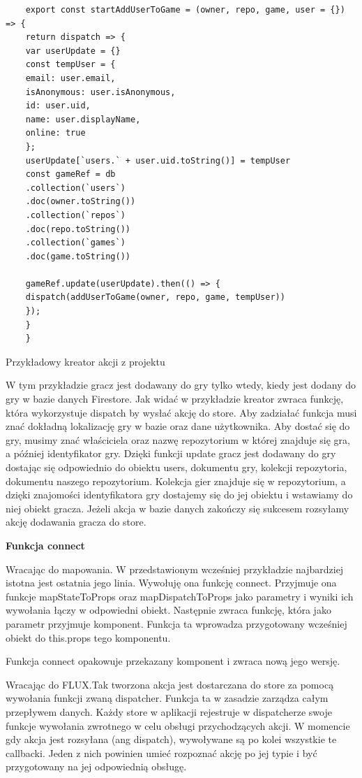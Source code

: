 \begin{listing}
	\begin{verbatim}
	export const startAddUserToGame = (owner, repo, game, user = {}) => {
	return dispatch => {
	var userUpdate = {}
	const tempUser = {
	email: user.email,
	isAnonymous: user.isAnonymous,
	id: user.uid,
	name: user.displayName,
	online: true
	};
	userUpdate[`users.` + user.uid.toString()] = tempUser
	const gameRef = db
	.collection(`users`)
	.doc(owner.toString())
	.collection(`repos`)
	.doc(repo.toString())
	.collection(`games`)
	.doc(game.toString())
	
	gameRef.update(userUpdate).then(() => {
	dispatch(addUserToGame(owner, repo, game, tempUser))
	});
	}
	}
	\end{verbatim}
	\caption{Przykładowy kreator akcji z projektu} \label{listing:firebase_action}
\end{listing}

W tym przykładzie gracz jest dodawany do gry tylko wtedy,
kiedy jest dodany do gry w bazie danych Firestore.
Jak widać w przykładzie kreator zwraca funkcję,
która wykorzystuje dispatch by wysłać akcję do store.
Aby zadziałać funkcja musi znać dokładną lokalizację gry w bazie oraz dane użytkownika.
Aby dostać się do gry, musimy znać właściciela oraz nazwę repozytorium w której znajduje się gra,
a później identyfikator gry.
Dzięki funkcji update gracz jest dodawany do gry dostając się odpowiednio do obiektu users,
dokumentu gry, kolekcji repozytoria, dokumentu naszego repozytorium.
Kolekcja gier znajduje się w repozytorium, a dzięki znajomości identyfikatora gry dostajemy się do jej obiektu i wstawiamy do niej obiekt gracza.
Jeżeli akcja w bazie danych zakończy się sukcesem rozsyłamy akcję dodawania gracza do store.
\begin{center}
	\textbf{Funkcja connect}
\end{center}
Wracając do mapowania. W przedstawionym wcześniej przykładzie najbardziej istotna jest ostatnia jego linia.
Wywołuję ona funkcję connect.
Przyjmuje ona funkcje mapStateToProps oraz mapDispatchToProps jako parametry i wyniki ich wywołania łączy w odpowiedni obiekt.
Następnie zwraca funkcję, która jako parametr przyjmuje komponent. Funkcja ta wprowadza przygotowany wcześniej obiekt do this.props tego komponentu.

Funkcja connect opakowuje przekazany komponent i zwraca nową jego wersję.

Wracając do FLUX.\@ Tak tworzona akcja jest dostarczana do store za pomocą wywołania funkcji zwaną dispatcher.
Funkcja ta w zasadzie zarządza całym przepływem danych.
Każdy store w aplikacji rejestruje w dispatcherze swoje funkcje wywołania zwrotnego w celu obsługi przychodzących akcji.
W momencie gdy akcja jest rozsyłana (ang dispatch), wywoływane są po kolei wszystkie te callbacki.
Jeden z nich powinien umieć rozpoznać akcję po jej typie i być przygotowany na jej odpowiednią obsługę.

